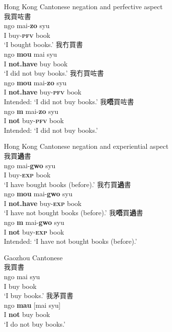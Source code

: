 \documentclass[output=paper]{langscibook}
\begin{document}
\ea Hong Kong Cantonese negation and perfective aspect \label{ex:lam5}\\
  \ea 我買咗書 \label{ex:lam5a}\\
    \gll ngo mai-\textbf{zo} syu\\
	I buy-\textbf{\textsc{pfv}} book\\
	\glt `I bought books.'
  \ex 我冇買書 \label{ex:lam5b}\\
    \gll ngo \textbf{mou} mai syu\\
	I \textbf{not.have} buy book\\
	\glt `I did not buy books.'
  \ex 我冇買咗書 \label{ex:lam5c}\\
  	\gll *ngo \textbf{mou} mai-\textbf{zo} syu\\
	I \textbf{not.have} buy-\textbf{\textsc{pfv}} book\\
	\glt Intended: `I did not buy books.'
  \ex 我\textbf{唔}買咗書 \label{ex:lam5d}\\
  	\gll *ngo \textbf{m} mai-\textbf{zo} syu\\
  	I \textbf{not} buy-\textbf{\textsc{pfv}} book\\
  	\glt Intended: `I did not buy books.'
\z \z


\ea Hong Kong Cantonese negation and experiential aspect \label{ex:lam6}\\
  \ea 我買\textbf{過}書 \label{ex:lam6a}\\
  	\gll ngo mai-\textbf{gwo} syu\\
	I buy-\textbf{\textsc{exp}} book\\
	\glt `I have bought books (before).'
  \ex 我冇買\textbf{過}書 \label{ex:lam6b}\\	
  	\gll ngo \textbf{mou} mai-\textbf{gwo} syu \\
  	I \textbf{not.have} buy-\textbf{\textsc{exp}} book\\
  	\glt `I have not bought books (before).'
  \ex 我\textbf{唔}買\textbf{過}書 \label{ex:lam6c}\\	
	\gll *ngo \textbf{m} mai-\textbf{gwo} syu\\
  	I \textbf{not} buy-\textbf{\textsc{exp}} book\\
	\glt Intended: `I have not bought books (before).'
\z\z


\ea Gaozhou Cantonese \label{ex:lam7}\\
  \ea 我買書 \label{ex:lam7a}\\
  	\gll ngo	mai	syu\\
  	I buy book\\
	\glt `I buy books.'
  \ex 我茅買書 \label{ex:lam7b}\\
  	\gll ngo \textbf{mau} [mai syu]\\
  	I \textbf{not} buy book\\
  	\glt `I do not buy books.'
\z\z
\end{document}
